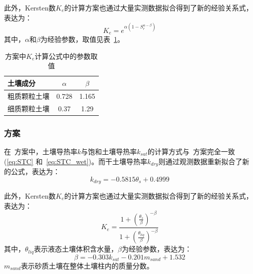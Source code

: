 此外，Kersten数$K_e$的计算方案也通过大量实测数据拟合得到了新的经验关系式，表达为：
$$K_e=e^{\alpha\left(1-S_r^{\alpha-\beta}\right)}$$
其中，$\alpha$和$\beta$为经验参数，取值见表~\ref{tab:lu2007方案中Ke参数取值}。
{
\begin{table}[htbp]
    \centering
    \caption{\citet{lu2007improved}方案中$K_e$计算公式中的参数取值}
    \label{tab:lu2007方案中Ke参数取值}
    \begin{tabular}{@{}lcc@{}}
    \toprule
    土壤成分               & $\alpha$     & $\beta$  \\
    \midrule
    粗质颗粒土壤                  & 0.728      & 1.165  \\
    细质颗粒土壤                  & 0.37    & 1.29   \\
    \bottomrule
    \end{tabular}
\end{table}
}


\subsubsection{\citet{Yan2019thermal}方案}
在~\citet{Yan2019thermal}方案中，土壤导热率$k$与饱和土壤导热率$k_{sat}$的计算方式与~\citet{Johansen1975}方案完全一致 (\eqref{eq:STC} 和~\eqref{eq:STC_wet})。而干土壤导热率$k_{dry}$则通过观测数据重新拟合了新的公式，表达为：
\begin{equation}\label{eq:STC_dry_Yan}
k_{dry}=-0.5815\theta_s + 0.4999
\end{equation}

此外，Kersten数$K_e$的计算方案也通过大量实测数据拟合得到了新的经验关系式，表达为：$$K_e=\frac{1+\left(\frac{\theta_s}{\beta}\right)^{-\beta}}{1+\left(\frac{\theta_{liq}}{\beta}\right)^{-\beta}}$$
其中，$\theta_{liq}$表示液态土壤体积含水量，$\beta$为经验参数，表达为：$$\beta = -0.303k_{sat} - 0.201m_{sand} + 1.532$$
$m_{sand}$表示砂质土壤在整体土壤柱内的质量分数。


